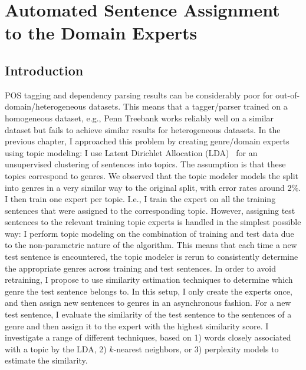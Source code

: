 \chapter{Automated Sentence Assignment to the Domain Experts}


\section{Introduction}

POS tagging and dependency parsing results can be considerably poor for out-of-domain/heterogeneous datasets. This means that a tagger/parser trained on a homogeneous dataset, e.g., Penn Treebank works reliably well on a similar dataset but fails to achieve similar results for heterogeneous datasets. In the previous chapter, I approached this problem by creating genre/domain experts using topic modeling: I use Latent Dirichlet Allocation (LDA)~\citep{Blei:2003:LDA:944919.944937,Blei:2012:PTM:2133806.2133826} for an unsupervised clustering of  sentences into topics. The assumption is that these topics correspond to genres. We observed that the topic modeler models the split into genres in a very similar way to the original split, with error rates around 2\%. I then train one expert per topic. I.e., I train the expert on all the training sentences that were assigned to the corresponding topic. 
However, assigning test sentences to the relevant training topic experts is handled in the simplest possible way: I perform topic modeling on the combination of training and test data due to the non-parametric nature of the algorithm. %
This means that each time a new test sentence is encountered, the topic modeler is rerun to consistently determine the appropriate genres across training and test sentences. In order to avoid retraining, I propose to use similarity estimation techniques to determine which genre the test sentence belongs to. In this setup, I only create the experts once, and then assign new sentences to genres in an asynchronous fashion. 
For a new test sentence, I evaluate the similarity of the test sentence to the sentences of a genre and then assign it to the expert with the highest similarity score. I investigate a range of different techniques, based on 1) words closely associated with a topic by the LDA, 2) $k$-nearest neighbors, or 3) perplexity models to estimate the similarity. 

